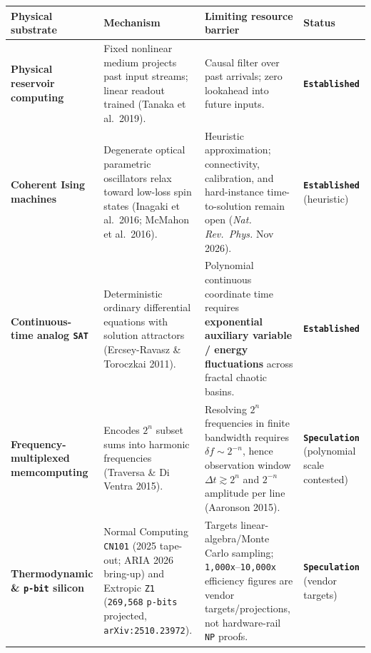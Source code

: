 \documentclass[10pt,letterpaper]{article}
\newcounter{none}
\begin{document}
{\def\LTcaptype{none} %
{\footnotesize\setlength{\tabcolsep}{3.8pt}\renewcommand{\arraystretch}{1.15}
\begin{longtable}[]{@{}
  >{\raggedright\arraybackslash}p{}
  >{\raggedright\arraybackslash}p{}
  >{\raggedright\arraybackslash}p{}
  >{\raggedright\arraybackslash}p{}@{}}
\toprule\noalign{}
\begin{minipage}[b]{\linewidth}\raggedright
\textbf{Physical substrate}
\end{minipage} & \begin{minipage}[b]{\linewidth}\raggedright
\textbf{Mechanism}
\end{minipage} & \begin{minipage}[b]{\linewidth}\raggedright
\textbf{Limiting resource barrier}
\end{minipage} & \begin{minipage}[b]{\linewidth}\raggedright
\textbf{Status}
\end{minipage} \\
\midrule\noalign{}
\endhead
\bottomrule\noalign{}
\endlastfoot
\textbf{Physical reservoir computing} & Fixed nonlinear medium projects
past input streams; linear readout trained (Tanaka et al.~2019). &
Causal filter over past arrivals; zero lookahead into future inputs. &
\textbf{\texttt{Established}} \\
\textbf{Coherent Ising machines} & Degenerate optical parametric
oscillators relax toward low-loss spin states (Inagaki et al.~2016;
McMahon et al.~2016). & Heuristic approximation; connectivity,
calibration, and hard-instance time-to-solution remain open (\emph{Nat.
Rev.~Phys.} Nov 2026). & \textbf{\texttt{Established}} (heuristic) \\
\textbf{Continuous-time analog \texttt{SAT}} & Deterministic ordinary
differential equations with solution attractors (Ercsey-Ravasz \&
Toroczkai 2011). & Polynomial continuous coordinate time requires
\textbf{exponential auxiliary variable / energy fluctuations} across
fractal chaotic basins. & \textbf{\texttt{Established}} \\
\textbf{Frequency-multiplexed memcomputing} & Encodes \(2^n\) subset
sums into harmonic frequencies (Traversa \& Di Ventra 2015). & Resolving
\(2^n\) frequencies in finite bandwidth requires
\(\delta f \sim 2^{-n}\), hence observation window
\(\Delta t \gtrsim 2^n\) and \(2^{-n}\) amplitude per line (Aaronson
2015). & \textbf{\texttt{Speculation}} (polynomial scale contested) \\
\textbf{Thermodynamic \& \texttt{p-bit} silicon} & Normal Computing
\texttt{CN101} (2025 tape-out; ARIA 2026 bring-up) and Extropic
\texttt{Z1} (\texttt{269,568} \texttt{p-bits} projected,
\texttt{arXiv:2510.\allowbreak{}23972}). & Targets linear-algebra/Monte Carlo
sampling; \texttt{1,000x}--\texttt{10,000x} efficiency figures are
vendor targets/projections, not hardware-rail \texttt{NP} proofs. &
\textbf{\texttt{Speculation}} (vendor targets) \\
\end{longtable}
}
}
\end{document}
